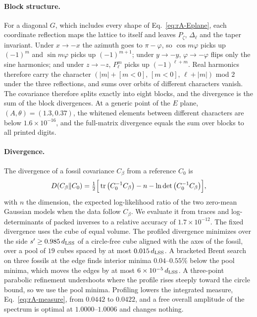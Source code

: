 \paragraph{Block structure.}
For a diagonal $G$, which includes every shape of Eq.~\eqref{eq:rA-Eplane}, each coordinate reflection maps the lattice to itself and leaves $P_\zeta$, $\Delta_\ell$ and the taper invariant.
Under $x\to-x$ the azimuth goes to $\pi-\varphi$, so $\cos m\varphi$ picks up $(-1)^m$ and $\sin m\varphi$ picks up $(-1)^{m+1}$; under $y\to-y$, $\varphi\to-\varphi$ flips only the sine harmonics; and under $z\to-z$, $P^m_\ell$ picks up $(-1)^{\ell+m}$.
Real harmonics therefore carry the character $(|m|+[m<0],\,[m<0],\,\ell+|m|)$ mod $2$ under the three reflections, and sums over orbits of different characters vanish.
The covariance therefore splits exactly into eight blocks, and the divergence is the sum of the block divergences.
At a generic point of the $E$ plane, $(A,\theta)=(1.3,0.37)$, the whitened elements between different characters are below $1.6\times10^{-16}$, and the full-matrix divergence equals the sum over blocks to all printed digits. %

\paragraph{Divergence.}
The divergence of a fossil covariance $C_\beta$ from a reference $C_0$ is
\begin{equation}
D(C_\beta\|C_0)=\tfrac12\Big[\operatorname{tr}\big(C_0^{-1}C_\beta\big)-n-\ln\det\big(C_0^{-1}C_\beta\big)\Big],
\label{eq:rA-kl}
\end{equation}
with $n$ the dimension, the expected log-likelihood ratio of the two zero-mean Gaussian models when the data follow $C_\beta$.
We evaluate it from traces and log-determinants of packed inverses to a relative accuracy of $1.7\times10^{-12}$. %
The fixed divergence uses the cube of equal volume.
The profiled divergence minimizes over the side $s'\geq0.985\,d_{\mathrm{LSS}}$ of a circle-free cube aligned with the axes of the fossil, over a pool of $19$ cubes spaced by at most $0.015\,d_{\mathrm{LSS}}$. %
A bracketed Brent search on three fossils at the edge finds interior minima $0.04$--$0.55\%$ below the pool minima, which moves the edges by at most $6\times10^{-5}\,d_{\mathrm{LSS}}$. %
A three-point parabolic refinement undershoots where the profile rises steeply toward the circle bound, so we use the pool minima.
Profiling lowers the integrated measure, Eq.~\eqref{eq:rA-measure}, from $0.0442$ to $0.0422$, and a free overall amplitude of the spectrum is optimal at $1.0000$--$1.0006$ and changes nothing. %

